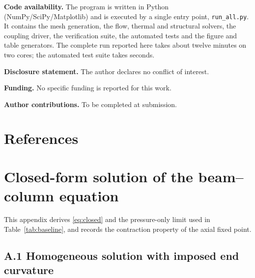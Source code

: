 \documentclass[11pt,a4paper]{article}
\begin{document}
\noindent\textbf{Code availability.}
The program is written in Python (NumPy/SciPy/Matplotlib) and is executed by a
single entry point, \texttt{run\_all.py}. It contains the mesh generation, the
flow, thermal and structural solvers, the coupling driver, the verification
suite, the automated tests and the figure and table generators. The complete
run reported here takes about twelve minutes on two cores; the automated test
suite takes seconds.

\noindent\textbf{Disclosure statement.}
The author declares no conflict of interest.

\noindent\textbf{Funding.}
No specific funding is reported for this work.

\noindent\textbf{Author contributions.}
To be completed at submission.

\section*{References}
%
  {}

\appendix

\section{Closed-form solution of the beam--column equation}
\label{app:closedform}

This appendix derives \eqref{eq:closed} and the pressure-only limit used in
Table~\ref{tab:baseline}, and records the contraction property of the axial
fixed point.

\subsection*{A.1 Homogeneous solution with imposed end curvature}
\end{document}
